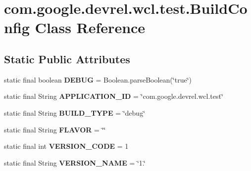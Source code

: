 \hypertarget{classcom_1_1google_1_1devrel_1_1wcl_1_1test_1_1BuildConfig}{}\section{com.\+google.\+devrel.\+wcl.\+test.\+Build\+Config Class Reference}
\label{classcom_1_1google_1_1devrel_1_1wcl_1_1test_1_1BuildConfig}
\subsection*{Static Public Attributes}
\begin{DoxyCompactItemize}
\item 
static final boolean {\bfseries D\+E\+B\+UG} = Boolean.\+parse\+Boolean(\char`\"{}true\char`\"{})\hypertarget{classcom_1_1google_1_1devrel_1_1wcl_1_1test_1_1BuildConfig_a2ab1c247b87510d28ad9af9205e6e6a8}{}\label{classcom_1_1google_1_1devrel_1_1wcl_1_1test_1_1BuildConfig_a2ab1c247b87510d28ad9af9205e6e6a8}

\item 
static final String {\bfseries A\+P\+P\+L\+I\+C\+A\+T\+I\+O\+N\+\_\+\+ID} = \char`\"{}com.\+google.\+devrel.\+wcl.\+test\char`\"{}\hypertarget{classcom_1_1google_1_1devrel_1_1wcl_1_1test_1_1BuildConfig_af0bba16c6439206b0081fc9103c21b05}{}\label{classcom_1_1google_1_1devrel_1_1wcl_1_1test_1_1BuildConfig_af0bba16c6439206b0081fc9103c21b05}

\item 
static final String {\bfseries B\+U\+I\+L\+D\+\_\+\+T\+Y\+PE} = \char`\"{}debug\char`\"{}\hypertarget{classcom_1_1google_1_1devrel_1_1wcl_1_1test_1_1BuildConfig_a835ee64dcee9df50f74c1679793cec22}{}\label{classcom_1_1google_1_1devrel_1_1wcl_1_1test_1_1BuildConfig_a835ee64dcee9df50f74c1679793cec22}

\item 
static final String {\bfseries F\+L\+A\+V\+OR} = \char`\"{}\char`\"{}\hypertarget{classcom_1_1google_1_1devrel_1_1wcl_1_1test_1_1BuildConfig_a0985747f90d0f4c2b6de188c1a3e06e6}{}\label{classcom_1_1google_1_1devrel_1_1wcl_1_1test_1_1BuildConfig_a0985747f90d0f4c2b6de188c1a3e06e6}

\item 
static final int {\bfseries V\+E\+R\+S\+I\+O\+N\+\_\+\+C\+O\+DE} = 1\hypertarget{classcom_1_1google_1_1devrel_1_1wcl_1_1test_1_1BuildConfig_ac18a184bfd9b46bed8b2c2288d3d468e}{}\label{classcom_1_1google_1_1devrel_1_1wcl_1_1test_1_1BuildConfig_ac18a184bfd9b46bed8b2c2288d3d468e}

\item 
static final String {\bfseries V\+E\+R\+S\+I\+O\+N\+\_\+\+N\+A\+ME} = \char`\"{}1.\char`\"{}\hypertarget{classcom_1_1google_1_1devrel_1_1wcl_1_1test_1_1BuildConfig_a4f07c08140439e81203fb9dd393c87f2}{}\label{classcom_1_1google_1_1devrel_1_1wcl_1_1test_1_1BuildConfig_a4f07c08140439e81203fb9dd393c87f2}

\end{DoxyCompactItemize}


